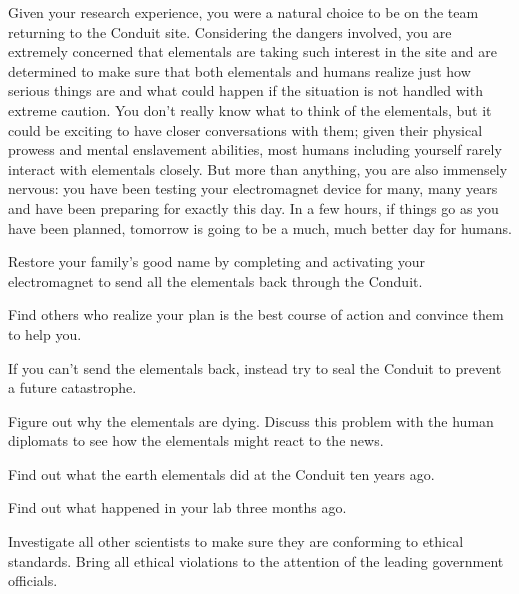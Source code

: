 \documentclass[char]{guildcamp1}
\begin{document}
Given your research experience, you were a natural choice to be on the team returning to the Conduit site. Considering the dangers involved, you are extremely concerned that elementals are taking such interest in the site and are determined to make sure that both elementals and humans realize just how serious things are and what could happen if the situation is not handled with extreme caution. You don't really know what to think of the elementals, but it could be exciting to have closer conversations with them; given their physical prowess and mental enslavement abilities, most humans including yourself rarely interact with elementals closely. But more than anything, you are also immensely nervous: you have been testing your electromagnet device for many, many years and have been preparing for exactly this day. In a few hours, if things go as you have been planned, tomorrow is going to be a much, much better day for humans.


\begin{itemz}[Goals]
  \item Restore your family's good name by completing and activating your electromagnet to send all the elementals back through the Conduit.
  \item Find others who realize your plan is the best course of action and convince them to help you. %
  \item If you can't send the elementals back, instead try to seal the Conduit to prevent a future catastrophe.
  \item Figure out why the elementals are dying. Discuss this problem with the human diplomats to see how the elementals might react to the news.
  \item Find out what the earth elementals did at the Conduit ten years ago.
  \item Find out what happened in your lab three months ago.
  \item Investigate all other scientists to make sure they are conforming to ethical standards. Bring all ethical violations to the attention of the leading government officials.
\end{itemz}
\end{document}
